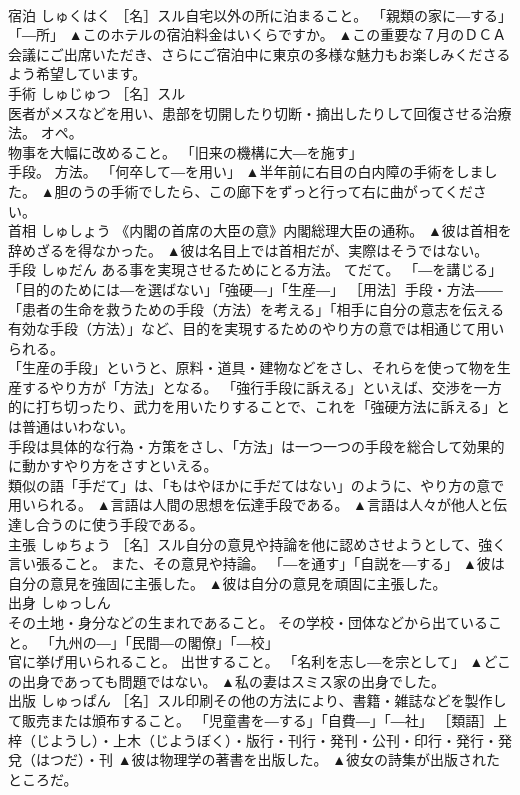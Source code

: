 \documentclass[8pt]{extreport}
\begin{document}
\begin{CJK}{UTF8}{min}
\\	宿泊	しゅくはく	［名］スル自宅以外の所に泊まること。 「親類の家に―する」「―所」	▲このホテルの宿泊料金はいくらですか。 ▲この重要な７月のＤＣＡ会議にご出席いただき、さらにご宿泊中に東京の多様な魅力もお楽しみくださるよう希望しています。
\\	手術	しゅじゅつ	［名］スル 
\\	医者がメスなどを用い、患部を切開したり切断・摘出したりして回復させる治療法。 オペ。 
\\	物事を大幅に改めること。 「旧来の機構に大―を施す」 
\\	手段。 方法。 「何卒して―を用い」	▲半年前に右目の白内障の手術をしました。 ▲胆のうの手術でしたら、この廊下をずっと行って右に曲がってください。
\\	首相	しゅしょう	《内閣の首席の大臣の意》内閣総理大臣の通称。	▲彼は首相を辞めざるを得なかった。 ▲彼は名目上では首相だが、実際はそうではない。
\\	手段	しゅだん	ある事を実現させるためにとる方法。 てだて。 「―を講じる」「目的のためには―を選ばない」「強硬―」「生産―」 ［用法］手段・方法――「患者の生命を救うための手段（方法）を考える」「相手に自分の意志を伝える有効な手段（方法）」など、目的を実現するためのやり方の意では相通じて用いられる。 
\\	「生産の手段」というと、原料・道具・建物などをさし、それらを使って物を生産するやり方が「方法」となる。 「強行手段に訴える」といえば、交渉を一方的に打ち切ったり、武力を用いたりすることで、これを「強硬方法に訴える」とは普通はいわない。 
\\	手段は具体的な行為・方策をさし、「方法」は一つ一つの手段を総合して効果的に動かすやり方をさすといえる。 
\\	類似の語「手だて」は、「もはやほかに手だてはない」のように、やり方の意で用いられる。	▲言語は人間の思想を伝達手段である。 ▲言語は人々が他人と伝達し合うのに使う手段である。
\\	主張	しゅちょう	［名］スル自分の意見や持論を他に認めさせようとして、強く言い張ること。 また、その意見や持論。 「―を通す」「自説を―する」	▲彼は自分の意見を強固に主張した。 ▲彼は自分の意見を頑固に主張した。
\\	出身	しゅっしん	
\\	その土地・身分などの生まれであること。 その学校・団体などから出ていること。 「九州の―」「民間―の閣僚」「―校」 
\\	官に挙げ用いられること。 出世すること。 「名利を志し―を宗として」	▲どこの出身であっても問題ではない。 ▲私の妻はスミス家の出身でした。
\\	出版	しゅっぱん	［名］スル印刷その他の方法により、書籍・雑誌などを製作して販売または頒布すること。 「児童書を―する」「自費―」「―社」 ［類語］上梓（じようし）・上木（じようぼく）・版行・刊行・発刊・公刊・印行・発行・発兌（はつだ）・刊	▲彼は物理学の著書を出版した。 ▲彼女の詩集が出版されたところだ。

\end{CJK}
\end{document}
